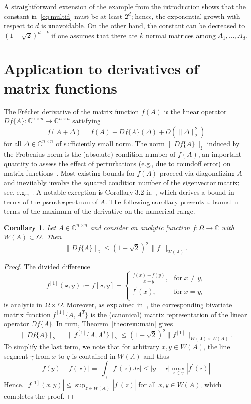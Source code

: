 \documentclass[11pt,a4paper]{amsart}
\newtheorem{corollary}[theorem]{Corollary}
\newcommand{\C}{{\mathbb C}}
\begin{document}
A straightforward extension of the example from the introduction shows that the constant in~\eqref{eq:multid} must be at least $2^d$; hence, the exponential growth with respect to $d$ is unavoidable. On the other hand, the constant can be decreased to $(1+\sqrt{2})^{d-k}$ if one assumes that there are $k$ normal matrices among $A_1,\ldots,A_d$.

\section{Application to derivatives of matrix functions} \label{sec:derivatives}

The Fr\'echet derivative of the matrix function $f(A)$ is the linear operator 
$Df\{A\}: \C^{n \times n} \to \C^{n \times n}$ satisfying
\[
 f(A+\Delta) = f(A) + Df\{A\}(\Delta) + O(\|\Delta\|_2^2)
\]
for all $\Delta \in \C^{n\times n}$ of sufficiently small norm. The norm $\|Df\{A\}\|_2$ induced by the Frobenius norm is the (absolute) condition number of $f(A)$, an important quantity to assess the effect of perturbations (e.g., due to roundoff error) on matrix functions~\cite[Chap. 3]{Higham2008}.
Most existing bounds for $f(A)$ proceed via diagonalizing $A$ and inevitably involve the squared condition number of the eigenvector matrix; see, e.g.,~\cite[Theorem 3.15]{Higham2008}. A notable exception is Corollary 3.2 in~\cite{Deadman2016}, which derives a bound in terms of the pseudospectrum of $A$.
The following corollary presents a bound in terms of the maximum of the derivative on the numerical range.

\begin{corollary}
Let $A\in \C^{n\times n}$ and consider an analytic function $f: \Omega \to \C$ with $W(A) \subset \Omega$. Then
 \[
  \|Df\{A\}\|_2 \le (1+\sqrt{2})^2\, \|f^\prime\|_{W(A)}.
 \]
\end{corollary}
\begin{proof}
The divided difference
\[
f^{[1]}(x,y):=f[x,y] = \left\{
\begin{array}{ll}
 \frac{f(x)-f(y)}{x-y}, & \text{for } x\not=y, \\
 f^\prime(x), & \text{for } x=y, \\
\end{array}\right.
\]
is analytic in $\Omega \times \Omega$. Moreover, as explained in~\cite{Kressner2014bivariate}, the corresponding bivariate matrix function $f^{[1]}\{A,A^T\}$ is the (canonical) matrix representation of the linear operator $Df\{A\}$. In turn, Theorem~\ref{theorem:main} gives
\[
 \|Df\{A\}\|_2 = \|f^{[1]}\{A,A^T\}\|_2 \le (1+\sqrt{2})^2 \|f^{[1]}\|_{W(A)\times W(A)}.
\]
To simplify the last term, we note that for arbitrary $x,y\in W(A)$, the line segment $\gamma$  from $x$ to $y$ is contained in $W(A)$ and thus
\[
 |f(y)-f(x)| = \Big| \int_\gamma f^\prime(z) dz \Big| \le |y-x| \max_{z\in\gamma}|f^\prime(z)|.
\]
Hence, $|f^{[1]}(x,y)| \le \sup_{z\in W(A)} |f^\prime(z)|$ for all $x,y\in W(A)$, which completes the proof.
\end{proof}
\end{document}
